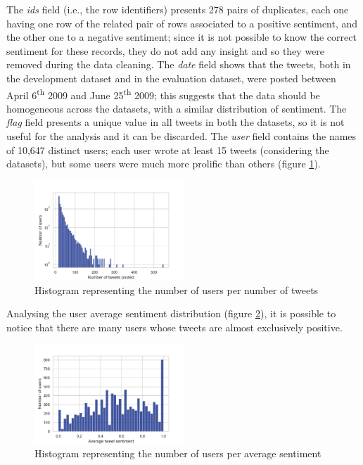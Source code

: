 \documentclass[conference]{IEEEtran}
\begin{document}
The \textit{ids} field (i.e., the row identifiers) presents 278 pairs of duplicates, each one having one row of the related pair of rows associated to a positive sentiment, and the other one to a negative sentiment; since it is not possible to know the correct sentiment for these records, they do not add any insight and so they were removed during the data cleaning. The \textit{date} field shows that the tweets, both in the development dataset and in the evaluation dataset, were posted between April 6\textsuperscript{th} 2009 and June 25\textsuperscript{th} 2009; this suggests that the data should be homogeneous across the datasets, with a similar distribution of sentiment. The \textit{flag} field presents a unique value in all tweets in both the datasets, so it is not useful for the analysis and it can be discarded. The \textit{user} field contains the names of 10,647 distinct users; each user wrote at least 15 tweets (considering the datasets), but some users were much more prolific than others (figure \ref{fig:user_per_tweet}).
\begin{figure}
    \includegraphics[width=0.5\textwidth]{user_per_tweet}
    \caption[Histogram of users per tweets]{Histogram representing the number of users per number of tweets}
    \label{fig:user_per_tweet}
\end{figure}
Analysing the user average sentiment distribution (figure \ref{fig:average_user_sentiment}), it is possible to notice that there are many users whose tweets are almost exclusively positive.
\begin{figure}
    \includegraphics[width=0.5\textwidth]{average_user_sentiment}
    \caption[User average sentiment]{Histogram representing the number of users per average sentiment}
    \label{fig:average_user_sentiment}
\end{figure}
\end{document}

